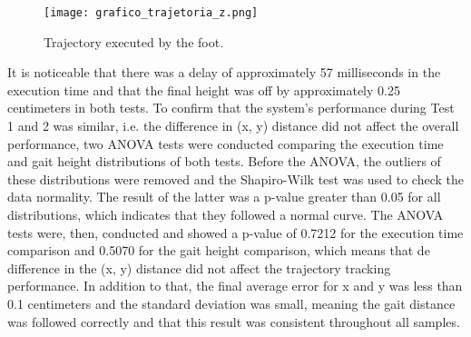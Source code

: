 \documentclass[conference]{IEEEtran}
\begin{document}
\begin{table}[!b]
  \vspace{-\baselineskip}
  \centering
  \caption{Results of the gait trajectory tracking experiment.}
  \label{tab:trajetoria}
\end{table}

\begin{figure}[!b]
  \centering
  \texttt{[image: grafico\_trajetoria\_z.png]}
  \caption{Trajectory executed by the foot.}
  \label{fig:grafico_trajetoria_xyz}
  \vspace{-\baselineskip}
\end{figure}

It is noticeable that there was a delay of approximately 57 milliseconds in the execution time and that the final height was off by approximately 0.25 centimeters in both tests. To confirm that the system's performance during Test 1 and 2 was similar, i.e. the difference in (x, y) distance did not affect the overall performance, two ANOVA \cite{cano2012six} tests were conducted comparing the execution time and gait height distributions of both tests. Before the ANOVA, the outliers of these distributions were removed and the Shapiro-Wilk \cite{leotti2005comparaccao} test was used to check the data normality. The result of the latter was a p-value greater than 0.05 for all distributions, which indicates that they followed a normal curve. The ANOVA tests were, then, conducted and showed a p-value of 0.7212 for the execution time comparison and 0.5070 for the gait height comparison, which means that de difference in the (x, y) distance did not affect the trajectory tracking performance. In addition to that, the final average error for x and y was less than 0.1 centimeters and the standard deviation was small, meaning the gait distance was followed correctly and that this result was consistent throughout all samples.
\end{document}
